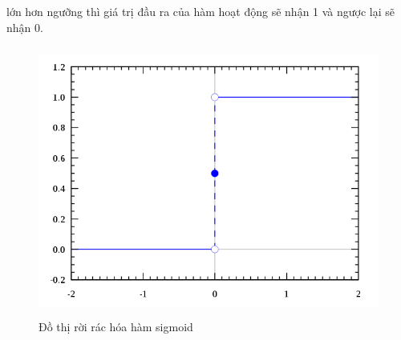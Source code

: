 lớn hơn ngưỡng thì giá trị đầu ra của hàm hoạt động sẽ nhận 1 và ngược lại sẽ 
nhận 0.
\begin{figure}[h!]
\centering
\includegraphics[height=3.5in, keepaspectratio=true]{step.png}
\caption{Đồ thị rời rác hóa hàm sigmoid}
\end{figure}
